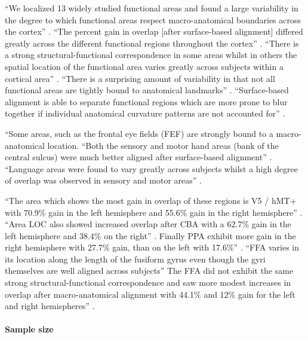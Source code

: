 %
``We localized 13 widely studied functional areas and found a large variability
in the degree to which functional areas respect macro-anatomical boundaries
across the cortex'' \citep{frost2012measuring}.
%
``The percent gain in overlap [after surface-based alignment] differed greatly
across the different functional regions throughout the cortex''
\citep{frost2012measuring}.
%
``There is a strong structural-functional correspondence in some areas whilst in
others the spatial location of the functional area varies greatly across
subjects within a cortical area'' \citep{frost2012measuring}.
%
``There is a surprising amount of variability in that not all functional areas
are tightly bound to anatomical landmarks'' \citep{frost2012measuring}.
%
``Surface-based alignment is able to separate functional regions which are more
prone to blur together if individual anatomical curvature patterns are not
accounted for'' \citep{frost2012measuring}.

%
``Some areas, such as the frontal eye fields (FEF) are strongly bound to a
macro-anatomical location.
%
``Both the sensory and motor hand areas (bank of the central sulcus) were much
better aligned after surface-based alignment'' \citep{frost2012measuring}.
%
``Language areas were found to vary greatly across subjects whilst a high degree
of overlap was observed in sensory and motor areas'' \citep{frost2012measuring}.

%
``The area which shows the most gain in overlap of these regions is V5 / hMT+
with 70.9\% gain in the left hemisphere and 55.6\% gain in the right
hemisphere'' \citep{frost2012measuring}.
%
``Area LOC also showed increased overlap after CBA with a 62.7\% gain in the
left hemisphere and 38.4\% on the right'' \citep{frost2012measuring}.
%
Finally PPA exhibit more gain in the right hemisphere with 27.7\% gain, than on
the left with 17.6\%'' \citep{frost2012measuring}.
%
``FFA varies in its location along the length of the fusiform gyrus even though
the gyri themselves are well aligned across subjects''
%
The FFA did not exhibit the same strong structural-functional correspondence and
saw more modest increases in overlap after macro-anatomical alignment with
44.1\% and 12\% gain for the left and right hemispheres''
\citep{frost2012measuring}.



\paragraph{Sample size}

